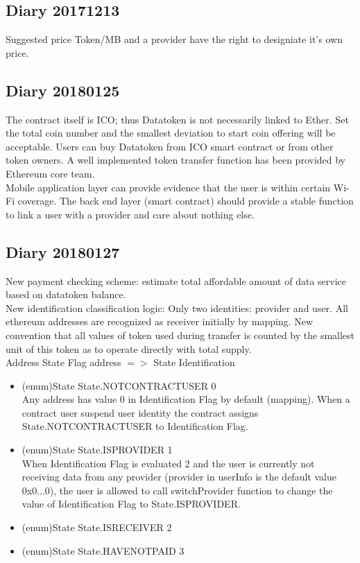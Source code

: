 \subsection{Diary 20171213}
Suggested price Token/MB and a provider have the right to designiate it's own price.
\subsection{Diary 20180125}
The contract itself is ICO; thus Datatoken is not necessarily linked to Ether.
Set the total coin number and the smallest deviation to start coin offering will be acceptable.
Users can buy Datatoken from ICO smart contract or from other token owners.
A well implemented token transfer function has been provided by Ethereum core team.
\\
Mobile application layer can provide evidence that the user is within certain Wi-Fi coverage.
The back end layer (smart contract) should provide a stable function
to link a user with a provider and care about nothing else.
\subsection{Diary 20180127}
New payment checking scheme: estimate total affordable amount of data service based on datatoken balance.\\
New identification classification logic: Only two identities: provider and user. All ethereum addresses are recognized as receiver initially by mapping. 
New convention that all values of token used during transfer is counted by the smallest unit of this token as to operate directly with total supply.
\\
Address State Flag address $=>$ State Identification
\begin{itemize}
    \item (enum)State State.NOTCONTRACTUSER 0\\
    Any address has value 0 in Identification Flag by default (mapping). When a contract user suspend user identity
    the contract assigns State.NOTCONTRACTUSER to Identification Flag.
    \item (enum)State State.ISPROVIDER 1\\
    When Identification Flag is evaluated 2 and the user is currently not receiving data from any provider
    (provider in userInfo is the default value 0x0...0), the user is allowed to call
    switchProvider function to change the value of Identification Flag to State.ISPROVIDER.

    \item (enum)State State.ISRECEIVER 2
    \item (enum)State State.HAVENOTPAID 3
\end{itemize}
